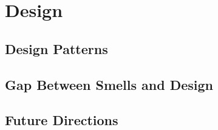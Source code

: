 \section{Design}

\subsection{Design Patterns}

\subsection{Gap Between Smells and Design}

\subsection{Future Directions}